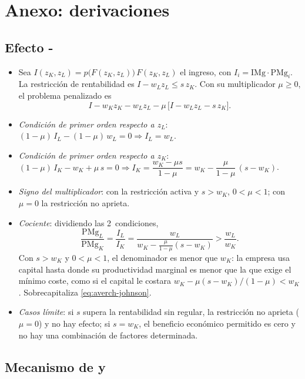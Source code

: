 \documentclass[11pt]{article}
\begin{document}
\clearpage
\appendix

\section{Anexo: derivaciones}\label{anexo:derivaciones}

\subsection{Efecto -}\label{anexo:aj}

\begin{itemize}
\item Sea $I(z_K,z_L)=p\big(F(z_K,z_L)\big)\,F(z_K,z_L)$ el ingreso, con $I_i=\mathrm{IMg}\cdot\mathrm{PMg}_i$. La restricción de rentabilidad es $I-w_Lz_L\leq s\,z_K$. Con su multiplicador $\mu\geq 0$, el problema penalizado es
  \[
  I-w_Kz_K-w_Lz_L-\mu\,\big[I-w_Lz_L-s\,z_K\big].
  \]
\item \emph{Condición de primer orden respecto a $z_L$}: $(1-\mu)\,I_L-(1-\mu)\,w_L=0\Rightarrow I_L=w_L$.
\item \emph{Condición de primer orden respecto a $z_K$}: $(1-\mu)\,I_K-w_K+\mu\,s=0\Rightarrow I_K=\dfrac{w_K-\mu s}{1-\mu}=w_K-\dfrac{\mu}{1-\mu}\,(s-w_K)$.
\item \emph{Signo del multiplicador}: con la restricción activa y $s>w_K$, $0<\mu<1$\nocite{AverchJohnson1962Behavior}; con $\mu=0$ la restricción no aprieta.
\item \emph{Cociente}: dividiendo las 2~condiciones,
  \[
  \frac{\mathrm{PMg}_L}{\mathrm{PMg}_K}=\frac{I_L}{I_K}=\frac{w_L}{w_K-\frac{\mu}{1-\mu}(s-w_K)}>\frac{w_L}{w_K}.
  \]
  Con $s>w_K$ y $0<\mu<1$, el denominador es menor que $w_K$: la empresa usa capital hasta donde su productividad marginal es menor que la que exige el mínimo coste, como si el capital le costara $w_K-\mu(s-w_K)/(1-\mu)<w_K$. Sobrecapitaliza \eqref{eq:averch-johnson}.
\item \emph{Casos límite}: si $s$ supera la rentabilidad sin regular, la restricción no aprieta ($\mu=0$) y no hay efecto; si $s=w_K$, el beneficio económico permitido es cero y no hay una combinación de factores determinada.\findemo
\end{itemize}

\subsection{Mecanismo de  y }\label{anexo:loeb-magat}
\end{document}
